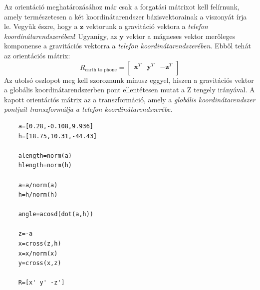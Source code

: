 \begin{answer}
	Az orientáció meghatározásához már csak a forgatási mátrixot kell felírnunk, amely természetesen a két koordinátarendszer bázisvektorainak a viszonyát írja le. Vegyük észre, hogy a $\mathbf{z}$ vektorunk a gravitáció vektora a \emph{telefon koordinátarendszerében}! Ugyanígy, az $\mathbf{y}$ vektor a mágneses vektor merőleges komponense a gravitációs vektorra a \emph{telefon koordinátarendszerében}. Ebből tehát az orientációs mátrix:
	\begin{equation*}
	R_{\text{earth to phone}}=\begin{bmatrix}
		\mathbf{x}^T & \mathbf{y}^T & -\mathbf{z}^T \\
	\end{bmatrix}
	\end{equation*}
	Az utolsó oszlopot meg kell szoroznunk mínusz eggyel, hiszen a gravitációs vektor a globális koordinátarendszerben pont ellentétesen mutat a Z tengely irányával. A kapott orientációs mátrix az a transzformáció, amely a \emph{globális koordinátarendszer pontjait transzformálja a telefon koordinátarendszerébe}.
	
	\begin{lstlisting}
	a=[0.28,-0.108,9.936]
	h=[18.75,10.31,-44.43]
	
	alength=norm(a)
	hlength=norm(h)
	
	a=a/norm(a)
	h=h/norm(h)
	
	angle=acosd(dot(a,h))
	
	z=-a
	x=cross(z,h)
	x=x/norm(x)
	y=cross(x,z)
	
	R=[x' y' -z']
	\end{lstlisting}
\end{answer}
\bigskip


